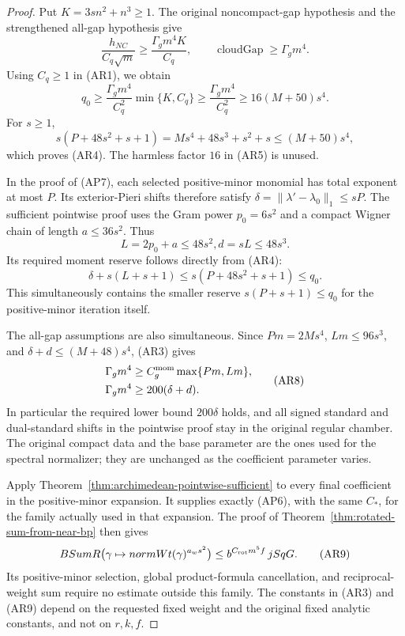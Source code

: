 \begin{proof}
Put \(K=3sn^2+n^3\ge1\).  The original noncompact-gap
hypothesis and the strengthened all-gap hypothesis give
\[
 \frac{h_{NC}}{C_q\sqrt m}\ge\frac{\Gamma_gm^4K}{C_q},
       \qquad \operatorname{cloudGap}\ge \Gamma_gm^4.
\]
Using \(C_q\ge1\) in (AR1), we obtain
\[
 q_0\ge\frac{\Gamma_gm^4}{C_q^2}\min\{K,C_q\}
      \ge\frac{\Gamma_gm^4}{C_q^2}
      \ge16(M+50)s^4.                                  \tag{AR5}
\]
For \(s\ge1\),
\[
 s(P+48s^2+s+1)
      =Ms^4+48s^3+s^2+s\le(M+50)s^4,
\]
which proves (AR4).  The harmless factor \(16\) in
(AR5) is unused.

In the proof of (AP7), each selected positive-minor monomial
has total exponent at most \(P\).  Its exterior-Pieri shifts
therefore satisfy \(\delta=\|\lambda'-\lambda_0\|_1\le sP\).
The sufficient pointwise proof uses the Gram power \(p_0=6s^2\)
and a compact Wigner chain of length \(a\le36s^2\).  Thus
\[
             L=2p_0+a\le48s^2,
                  d=sL\le48s^3 .                      \tag{AR6}
\]
Its required moment reserve follows directly from (AR4):
\[
       \delta+s(L+s+1)
             \le s(P+48s^2+s+1)\le q_0.                \tag{AR7}
\]
This simultaneously contains the smaller reserve
\(s(P+s+1)\le q_0\) for the positive-minor iteration itself.

The all-gap assumptions are also simultaneous.  Since
\(Pm=2Ms^4\), \(Lm\le96s^3\), and
\(\delta+d\le(M+48)s^4\), (AR3) gives
\[
 \begin{split}
 \Gamma_gm^4&\ge C_g^{\rm mom}\max\{Pm,Lm\},\\
 \Gamma_gm^4&\ge200(\delta+d).
 \end{split}                                           \tag{AR8}
\]
In particular the required lower bound \(200\delta\)
holds, and all signed standard and dual-standard shifts in
the pointwise proof stay in the original regular chamber.
The original compact data and the base parameter are the
ones used for the spectral normalizer; they are unchanged
as the coefficient parameter varies.

Apply Theorem~\ref{thm:archimedean-pointwise-sufficient} to
every final coefficient in the positive-minor expansion.
It supplies exactly (AP6), with the same \(C_*\), for the
family actually used in that expansion.  The proof of
Theorem~\ref{thm:rotated-sum-from-near-bp} then gives
\[
 BSumR\bigl(\gamma\mapsto normWt(\gamma)^{a_ws^2}\bigr)
       \le b^{C_{\rm rot}m^5f}\,jSqG.
                                                        \tag{AR9}
\]
Its positive-minor selection, global product-formula
cancellation, and reciprocal-weight sum require no estimate
outside this family.  The constants in (AR3) and (AR9)
depend on the requested fixed weight and the original
fixed analytic constants, and not on \(r,k,f\).
\end{proof}

